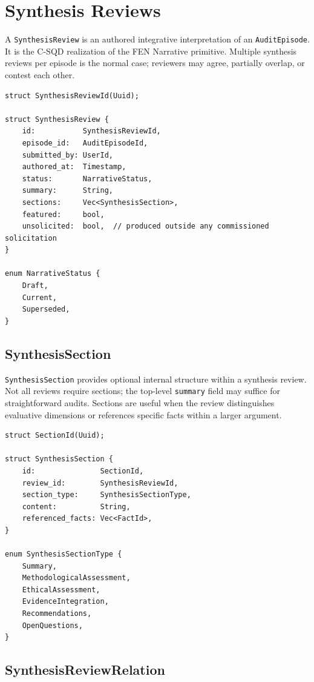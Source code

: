\documentclass[11pt]{article}
\begin{document}
\section{Synthesis Reviews}

A \texttt{SynthesisReview} is an authored integrative interpretation of an
\texttt{AuditEpisode}. It is the C-SQD realization of the FEN Narrative
primitive. Multiple synthesis reviews per episode is the normal case; reviewers
may agree, partially overlap, or contest each other.

\begin{lstlisting}
struct SynthesisReviewId(Uuid);

struct SynthesisReview {
    id:           SynthesisReviewId,
    episode_id:   AuditEpisodeId,
    submitted_by: UserId,
    authored_at:  Timestamp,
    status:       NarrativeStatus,
    summary:      String,
    sections:     Vec<SynthesisSection>,
    featured:     bool,
    unsolicited:  bool,  // produced outside any commissioned solicitation
}

enum NarrativeStatus {
    Draft,
    Current,
    Superseded,
}
\end{lstlisting}

\subsection{SynthesisSection}

\texttt{SynthesisSection} provides optional internal structure within a
synthesis review. Not all reviews require sections; the top-level
\texttt{summary} field may suffice for straightforward audits. Sections are
useful when the review distinguishes evaluative dimensions or references
specific facts within a larger argument.

\begin{lstlisting}
struct SectionId(Uuid);

struct SynthesisSection {
    id:               SectionId,
    review_id:        SynthesisReviewId,
    section_type:     SynthesisSectionType,
    content:          String,
    referenced_facts: Vec<FactId>,
}

enum SynthesisSectionType {
    Summary,
    MethodologicalAssessment,
    EthicalAssessment,
    EvidenceIntegration,
    Recommendations,
    OpenQuestions,
}
\end{lstlisting}

\subsection{SynthesisReviewRelation}
\end{document}
